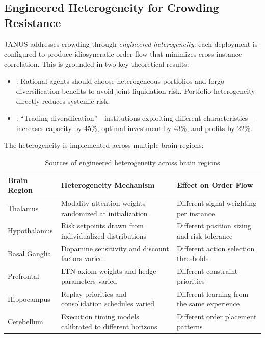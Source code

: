 \documentclass[12pt, a4paper]{article}
\begin{document}
\subsection{Engineered Heterogeneity for Crowding Resistance}
\label{sec:heterogeneity}

JANUS addresses crowding through \textit{engineered heterogeneity}: each deployment is configured to produce idiosyncratic order flow that minimizes cross-instance correlation. This is grounded in two key theoretical results:

\begin{itemize}
	\item \citet{wagner2011diversity}: Rational agents should choose heterogeneous portfolios and forgo diversification benefits to avoid joint liquidation risk. Portfolio heterogeneity directly reduces systemic risk.
	\item \citet{demiguel2021crowding}: ``Trading diversification''---institutions exploiting different characteristics---increases capacity by 45\%, optimal investment by 43\%, and profits by 22\%.
\end{itemize}

The heterogeneity is implemented across multiple brain regions:

\begin{table}[htbp]
	\centering
	\caption{Sources of engineered heterogeneity across brain regions}
	\label{tab:heterogeneity}
	\begin{tabularx}{\textwidth}{|l|L|L|}
		\hline
		\textbf{Brain Region} & \textbf{Heterogeneity Mechanism}                         & \textbf{Effect on Order Flow}                \\
		\hline
		Thalamus              & Modality attention weights randomized at initialization  & Different signal weighting per instance      \\
		\hline
		Hypothalamus          & Risk setpoints drawn from individualized distributions   & Different position sizing and risk tolerance \\
		\hline
		Basal Ganglia         & Dopamine sensitivity and discount factors varied         & Different action selection thresholds        \\
		\hline
		Prefrontal            & LTN axiom weights and hedge parameters varied            & Different constraint priorities              \\
		\hline
		Hippocampus           & Replay priorities and consolidation schedules varied     & Different learning from the same experience  \\
		\hline
		Cerebellum            & Execution timing models calibrated to different horizons & Different order placement patterns           \\
		\hline
	\end{tabularx}
\end{table}
\end{document}
